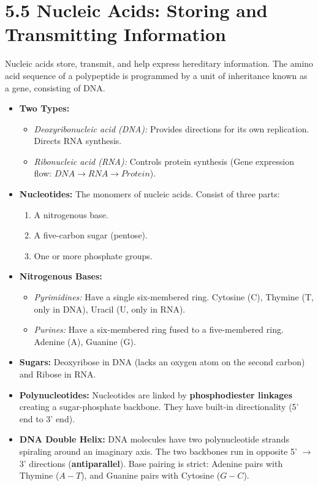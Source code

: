 \documentclass[11pt, a4paper]{article}
\begin{document}
\section*{5.5 Nucleic Acids: Storing and Transmitting Information}
Nucleic acids store, transmit, and help express hereditary information. The amino acid sequence of a polypeptide is programmed by a unit of inheritance known as a gene, consisting of DNA.
\begin{itemize}
    \item \textbf{Two Types:}
    \begin{itemize}
        \item \textit{Deoxyribonucleic acid (DNA):} Provides directions for its own replication. Directs RNA synthesis.
        \item \textit{Ribonucleic acid (RNA):} Controls protein synthesis (Gene expression flow: $DNA \rightarrow RNA \rightarrow Protein$).
    \end{itemize}
    \item \textbf{Nucleotides:} The monomers of nucleic acids. Consist of three parts:
    \begin{enumerate}
        \item A nitrogenous base.
        \item A five-carbon sugar (pentose).
        \item One or more phosphate groups.
    \end{enumerate}
    \item \textbf{Nitrogenous Bases:}
    \begin{itemize}
        \item \textit{Pyrimidines:} Have a single six-membered ring. Cytosine (C), Thymine (T, only in DNA), Uracil (U, only in RNA).
        \item \textit{Purines:} Have a six-membered ring fused to a five-membered ring. Adenine (A), Guanine (G).
    \end{itemize}
    \item \textbf{Sugars:} Deoxyribose in DNA (lacks an oxygen atom on the second carbon) and Ribose in RNA.
    \item \textbf{Polynucleotides:} Nucleotides are linked by \textbf{phosphodiester linkages} creating a sugar-phosphate backbone. They have built-in directionality (5' end to 3' end).
    \item \textbf{DNA Double Helix:} DNA molecules have two polynucleotide strands spiraling around an imaginary axis. The two backbones run in opposite 5' $\rightarrow$ 3' directions (\textbf{antiparallel}). Base pairing is strict: Adenine pairs with Thymine ($A-T$), and Guanine pairs with Cytosine ($G-C$).
\end{itemize}
\end{document}
